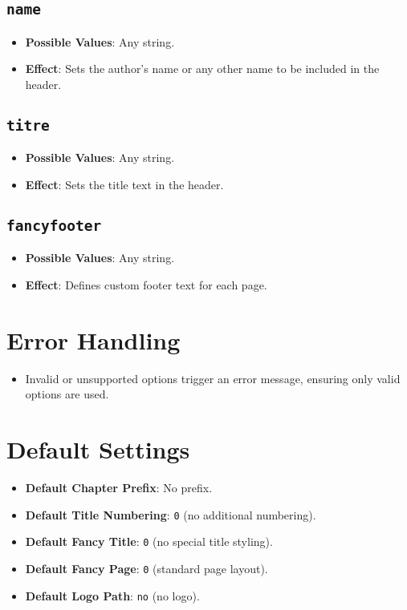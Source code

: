 \documentclass[12pt,twoside]{report}
\begin{document}
\subsection{\texttt{name}}
\begin{itemize}
    \item \textbf{Possible Values}: Any string.
    \item \textbf{Effect}: Sets the author's name or any other name to be included in the header.
\end{itemize}

\subsection{\texttt{titre}}
\begin{itemize}
    \item \textbf{Possible Values}: Any string.
    \item \textbf{Effect}: Sets the title text in the header.
\end{itemize}

\subsection{\texttt{fancyfooter}}
\begin{itemize}
    \item \textbf{Possible Values}: Any string.
    \item \textbf{Effect}: Defines custom footer text for each page.
\end{itemize}

\section{Error Handling}
\begin{itemize}
    \item Invalid or unsupported options trigger an error message, ensuring only valid options are used.
\end{itemize}

\section{Default Settings}
\begin{itemize}
    \item \textbf{Default Chapter Prefix}: No prefix.
    \item \textbf{Default Title Numbering}: \texttt{0} (no additional numbering).
    \item \textbf{Default Fancy Title}: \texttt{0} (no special title styling).
    \item \textbf{Default Fancy Page}: \texttt{0} (standard page layout).
    \item \textbf{Default Logo Path}: \texttt{no} (no logo).
\end{itemize}
\end{document}

